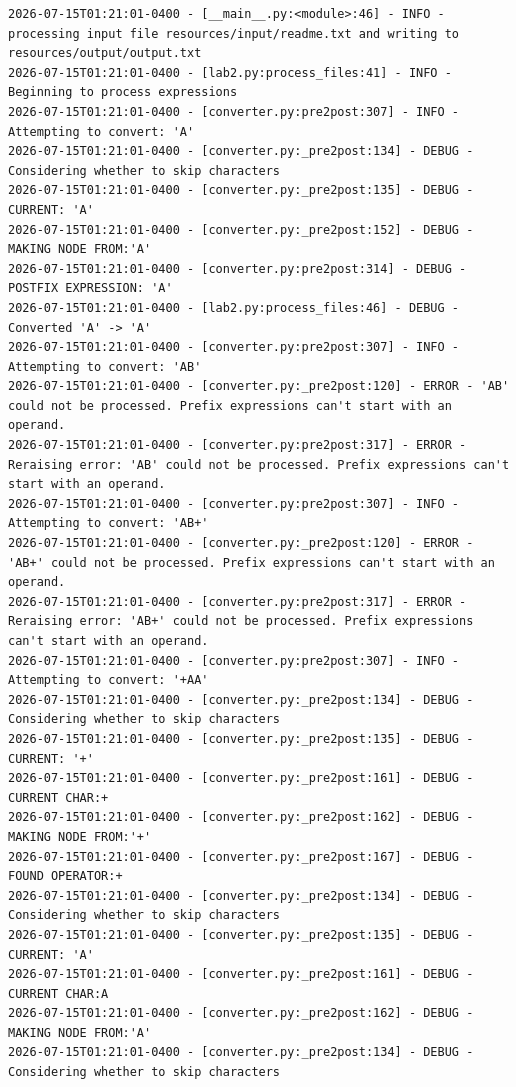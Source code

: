 \documentclass[10pt,letterpaper,final]{report}
\begin{document}
\begin{verbatim}
2026-07-15T01:21:01-0400 - [__main__.py:<module>:46] - INFO - processing input file resources/input/readme.txt and writing to resources/output/output.txt
2026-07-15T01:21:01-0400 - [lab2.py:process_files:41] - INFO - Beginning to process expressions
2026-07-15T01:21:01-0400 - [converter.py:pre2post:307] - INFO - Attempting to convert: 'A'
2026-07-15T01:21:01-0400 - [converter.py:_pre2post:134] - DEBUG - Considering whether to skip characters
2026-07-15T01:21:01-0400 - [converter.py:_pre2post:135] - DEBUG - CURRENT: 'A'
2026-07-15T01:21:01-0400 - [converter.py:_pre2post:152] - DEBUG - MAKING NODE FROM:'A'
2026-07-15T01:21:01-0400 - [converter.py:pre2post:314] - DEBUG - POSTFIX EXPRESSION: 'A'
2026-07-15T01:21:01-0400 - [lab2.py:process_files:46] - DEBUG - Converted 'A' -> 'A'
2026-07-15T01:21:01-0400 - [converter.py:pre2post:307] - INFO - Attempting to convert: 'AB'
2026-07-15T01:21:01-0400 - [converter.py:_pre2post:120] - ERROR - 'AB' could not be processed. Prefix expressions can't start with an operand.
2026-07-15T01:21:01-0400 - [converter.py:pre2post:317] - ERROR - Reraising error: 'AB' could not be processed. Prefix expressions can't start with an operand.
2026-07-15T01:21:01-0400 - [converter.py:pre2post:307] - INFO - Attempting to convert: 'AB+'
2026-07-15T01:21:01-0400 - [converter.py:_pre2post:120] - ERROR - 'AB+' could not be processed. Prefix expressions can't start with an operand.
2026-07-15T01:21:01-0400 - [converter.py:pre2post:317] - ERROR - Reraising error: 'AB+' could not be processed. Prefix expressions can't start with an operand.
2026-07-15T01:21:01-0400 - [converter.py:pre2post:307] - INFO - Attempting to convert: '+AA'
2026-07-15T01:21:01-0400 - [converter.py:_pre2post:134] - DEBUG - Considering whether to skip characters
2026-07-15T01:21:01-0400 - [converter.py:_pre2post:135] - DEBUG - CURRENT: '+'
2026-07-15T01:21:01-0400 - [converter.py:_pre2post:161] - DEBUG - CURRENT CHAR:+
2026-07-15T01:21:01-0400 - [converter.py:_pre2post:162] - DEBUG - MAKING NODE FROM:'+'
2026-07-15T01:21:01-0400 - [converter.py:_pre2post:167] - DEBUG - FOUND OPERATOR:+
2026-07-15T01:21:01-0400 - [converter.py:_pre2post:134] - DEBUG - Considering whether to skip characters
2026-07-15T01:21:01-0400 - [converter.py:_pre2post:135] - DEBUG - CURRENT: 'A'
2026-07-15T01:21:01-0400 - [converter.py:_pre2post:161] - DEBUG - CURRENT CHAR:A
2026-07-15T01:21:01-0400 - [converter.py:_pre2post:162] - DEBUG - MAKING NODE FROM:'A'
2026-07-15T01:21:01-0400 - [converter.py:_pre2post:134] - DEBUG - Considering whether to skip characters

\end{verbatim}
\end{document}
